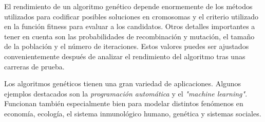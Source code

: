 El rendimiento de un algoritmo genético depende enormemente de los métodos utilizados para codificar posibles soluciones en cromosomas y el criterio utilizado en la función fitness para evaluar a los candidatos.
Otros detalles importantes a tener en cuenta son las probabilidades de recombinación y mutación, el tamaño de la población y el número de iteraciones. Estos valores puedes ser ajustados convenientemente después
de analizar el rendimiento del algoritmo tras unas carreras de prueba.

Los algoritmos genéticos tienen una gran variedad de aplicaciones. Algunos ejemplos destacados son la \textit{programación automática} y el \textit{"machine learning"}. Funcionan también especialmente bien para
modelar distintos fenómenos en economía, ecología, el sistema inmunológico humano, genética y sistemas sociales.
